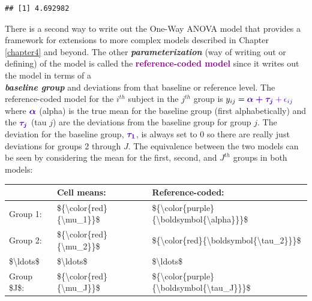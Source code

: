 \documentclass[]{book}
\newenvironment{Shaded}{\begin{snugshade}}{\end{snugshade}}
\newcommand{\KeywordTok}[1]{\textcolor[rgb]{0.13,0.29,0.53}{\textbf{#1}}}
\newcommand{\OperatorTok}[1]{\textcolor[rgb]{0.81,0.36,0.00}{\textbf{#1}}}
\newcommand{\NormalTok}[1]{#1}
\begin{document}
\begin{Shaded}
\end{Shaded}

\begin{verbatim}
## [1] 4.692982
\end{verbatim}

There is a second way to write out the One-Way ANOVA model that provides
a framework for extensions to more complex models described in Chapter
\ref{chapter4} and beyond. The other \textbf{\emph{parameterization}}
(way of writing out or defining) of the model is called the
\textcolor{purple}{\textbf{reference-coded model}} since it writes out
the model in terms of a\\
\textbf{\emph{baseline group}} and deviations from that baseline or
reference level. The reference-coded model for the \(i^{th}\) subject in
the \(j^{th}\) group is
\(y_{ij} =\color{purple}{\boldsymbol{\alpha + \tau_j}}+\epsilon_{ij}\)
where \(\color{purple}{\boldsymbol{\alpha}}\) (alpha) is the true mean
for the baseline group (first alphabetically) and the
\(\color{purple}{\boldsymbol{\tau_j}}\) (tau \(j\)) are the deviations
from the baseline group for group \(j\). The deviation for the baseline
group, \(\color{purple}{\boldsymbol{\tau_1}}\), is always set to 0 so
there are really just deviations for groups 2 through \(J\). The
equivalence between the two models can be seen by considering the mean
for the first, second, and \(J^{th}\) groups in both models:

\begin{tabular}{l|l|l}
\hline
 & Cell means: & Reference-coded:\\
\hline
Group 1: & \$\{\textbackslash{}color\{red\}\{\textbackslash{}mu\_1\}\}\$ & \$\{\textbackslash{}color\{purple\}\{\textbackslash{}boldsymbol\{\textbackslash{}alpha\}\}\}\$\\
\hline
Group 2: & \$\{\textbackslash{}color\{red\}\{\textbackslash{}mu\_2\}\}\$ & \$\{\textbackslash{}color\{red\}\{\textbackslash{}boldsymbol\{\textbackslash{}tau\_2\}\}\}\$\\
\hline
\$\textbackslash{}ldots\$ & \$\textbackslash{}ldots\$ & \$\textbackslash{}ldots\$\\
\hline
Group \$J\$: & \$\{\textbackslash{}color\{red\}\{\textbackslash{}mu\_J\}\}\$ & \$\{\textbackslash{}color\{purple\}\{\textbackslash{}boldsymbol\{\textbackslash{}tau\_J\}\}\}\$\\
\hline
\end{tabular}
\end{document}
